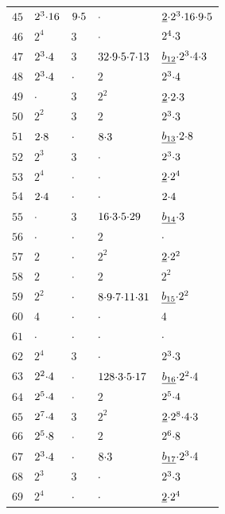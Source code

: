 \begin{longtable}{l|llll}
$45$ & $2^3\mathord{\cdot}16$ & $9\mathord{\cdot}5$ & $\mathord{\cdot}$ & $\underline{2}\mathord{\cdot}2^3\mathord{\cdot}16\mathord{\cdot}9\mathord{\cdot}5$ \\
$46$ & $2^4$ & $3$ & $\mathord{\cdot}$ & $2^4\mathord{\cdot}3$ \\
$47$ & $2^3\mathord{\cdot}4$ & $3$ &  $32\mathord{\cdot}9\mathord{\cdot}5\mathord{\cdot}7\mathord{\cdot}13$ & $\underline{b_{12}}\mathord{\cdot}2^3\mathord{\cdot}4\mathord{\cdot}3$  \\
$48$ & $2^3\mathord{\cdot}4$ & $\mathord{\cdot}$ & $2$ & $2^3\mathord{\cdot}4$ \\
$49$ & $\mathord{\cdot}$ & $3$ & $2^2$ & $\underline{2}\mathord{\cdot}2\mathord{\cdot}3$ \\
$50$ & $2^2$ & $3$ & $2$ & $2^3\mathord{\cdot}3$ \\
$51$ & $2\mathord{\cdot}8$ & $\mathord{\cdot}$ & $8\mathord{\cdot}3$ & $\underline{b_{13}}\mathord{\cdot}2\mathord{\cdot}8$ \\
$52$ & $2^3$ & $3$ & $\mathord{\cdot}$ & $2^3\mathord{\cdot}3$ \\
$53$ & $2^4$ & $\mathord{\cdot}$ & $\mathord{\cdot}$ & $\underline{2}\mathord{\cdot}2^4$ \\
$54$ & $2\mathord{\cdot}4$ & $\mathord{\cdot}$ & $\mathord{\cdot}$ & $2\mathord{\cdot}4$ \\
$55$ & $\mathord{\cdot}$ & $3$ & $16\mathord{\cdot}3\mathord{\cdot}5\mathord{\cdot}29$ & $\underline{b_{14}}\mathord{\cdot}3$ \\
$56$ & $\mathord{\cdot}$ & $\mathord{\cdot}$ & $2$ & $\mathord{\cdot}$ \\
$57$ & $2$ & $\mathord{\cdot}$ & $2^2$ & $\underline{2}\mathord{\cdot}2^2$ \\
$58$ & $2$ & $\mathord{\cdot}$ & $2$  & $2^2$\\
$59$ & $2^2$ & $\mathord{\cdot}$ & $8\mathord{\cdot}9\mathord{\cdot}7\mathord{\cdot}11\mathord{\cdot}31$ & $\underline{b_{15}}\mathord{\cdot}2^2$ \\
$60$ & $4$ & $\mathord{\cdot}$ & $\mathord{\cdot}$ & $4$ \\
$61$ & $\mathord{\cdot}$ & $\mathord{\cdot}$ & $\mathord{\cdot}$  & $\mathord{\cdot}$\\
\hline
$62$ & $2^4$ & $3$ & $\mathord{\cdot}$ & $2^3\mathord{\cdot}3$ \\
$63$ & $2^2\mathord{\cdot}4$ & $\mathord{\cdot}$ & $128\mathord{\cdot}3\mathord{\cdot}5\mathord{\cdot}17$  & $\underline{b_{16}}\mathord{\cdot}2^2\mathord{\cdot}4$\\
$64$ & $2^5\mathord{\cdot}4$ & $\mathord{\cdot}$ & $2$  & $2^5\mathord{\cdot}4$\\
$65$ & $2^7\mathord{\cdot}4$ & $3$ & $2^2$  & $\underline{2}\mathord{\cdot}2^8\mathord{\cdot}4\mathord{\cdot}3$\\
$66$ & $2^5\mathord{\cdot}8$ & $\mathord{\cdot}$ & $2$  & $2^6\mathord{\cdot}8$\\
$67$ & $2^3\mathord{\cdot}4$ & $\mathord{\cdot}$ & $8\mathord{\cdot}3$  & $\underline{b_{17}}\mathord{\cdot}2^3\mathord{\cdot}4$\\
$68$ & $2^3$ & $3$ & $\mathord{\cdot}$ & $2^3\mathord{\cdot}3$\\
$69$ & $2^4$ & $\mathord{\cdot}$ & $\mathord{\cdot}$ & $\underline{2}\mathord{\cdot}2^4$\\

\end{longtable}
